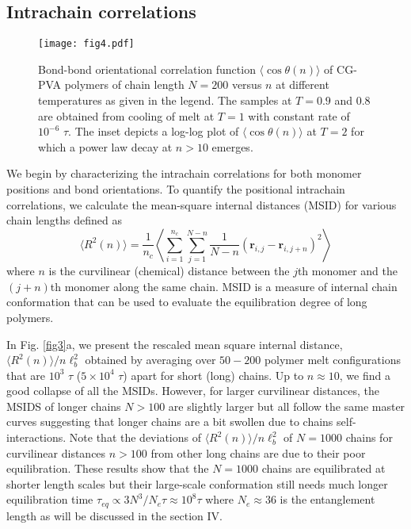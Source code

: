 \documentclass[pre,showpacs,notitlepage,twocolumn]{revtex4-1}
\begin{document}
\subsection*{ Intrachain correlations}
\begin{figure}[t]
 \texttt{[image: fig4.pdf]}
\caption{Bond-bond orientational correlation function $ \langle \cos \theta  (n) \rangle$ of CG-PVA polymers of chain length $N=200$ versus $n$ at different temperatures as given in the legend. The samples at $T=0.9$ and 0.8 are obtained from cooling of melt at $T=1$  with constant rate of $10^{-6}$ $\tau$. The inset depicts a log-log plot of $ \langle \cos \theta  (n) \rangle$ at $T=2$ for which a power law decay at $n>10$ emerges.}
\label{fig4} 
\end{figure}
%
We begin by characterizing the  intrachain correlations for both monomer positions and bond orientations. To quantify the positional intrachain correlations,  we calculate the mean-square internal distances (MSID) for various chain lengths  defined as 
\begin{equation}
 \langle R^2(n) \rangle=\frac{1}{n_c} \left\langle \sum_{i=1}^{n_c}  \sum_{j=1}^{N-n} \frac{1}{N-n}(\mathbf{r}_{i,j}-\mathbf{r}_{i,j+n})^2 \right\rangle
\end{equation}
%
where $n$ is the curvilinear (chemical) distance between the $j$th monomer and
the $(j+n)$th monomer along the same chain.  MSID is a  measure of
internal chain conformation that can be used to evaluate the equilibration degree of long polymers.

In Fig. \ref{fig3}a, we present  the rescaled mean square internal distance, $\langle R^2(n) \rangle/ n  \ell_b^2 $  obtained by averaging over  $50-200$ polymer melt configurations
that are  $10^3$ $\tau$ ($5\times10^4$ $\tau$) apart for short (long) chains. Up to $n \approx 10$, we find a good collapse of all the MSIDs. However, for larger curvilinear distances,
the MSIDS of  longer chains  $N >100$ are slightly larger but   all follow the same master curves  suggesting that longer chains are a bit swollen due to chains self-interactions.
Note that the deviations of $\langle R^2(n) \rangle/n \ell_b^2$ of   $N=1000$ chains  for curvilinear distances $n>100$ from other long chains are due to their poor equilibration.
These results show that the $N=1000$ chains are   equilibrated at shorter length scales but their large-scale conformation still needs much longer equilibration time  $ \tau_{eq} \propto 3 N^3 /N_e\tau \approx 10^8 \tau$ where $N_e \approx 36$ is
the entanglement length as will be discussed in the  section IV. 
\end{document}
